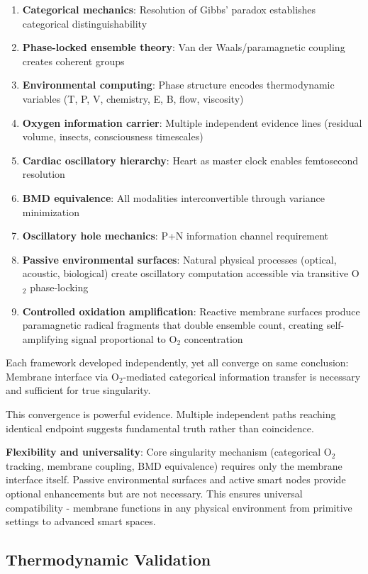 \documentclass[11pt,a4paper]{article}
\theoremstyle{definition}
\theoremstyle{remark}
\begin{document}
\begin{enumerate}
\item \textbf{Categorical mechanics}: Resolution of Gibbs' paradox establishes categorical distinguishability
\item \textbf{Phase-locked ensemble theory}: Van der Waals/paramagnetic coupling creates coherent groups
\item \textbf{Environmental computing}: Phase structure encodes thermodynamic variables (T, P, V, chemistry, E, B, flow, viscosity)
\item \textbf{Oxygen information carrier}: Multiple independent evidence lines (residual volume, insects, consciousness timescales)
\item \textbf{Cardiac oscillatory hierarchy}: Heart as master clock enables femtosecond resolution
\item \textbf{BMD equivalence}: All modalities interconvertible through variance minimization
\item \textbf{Oscillatory hole mechanics}: P+N information channel requirement
\item \textbf{Passive environmental surfaces}: Natural physical processes (optical, acoustic, biological) create oscillatory computation accessible via transitive O$_2$ phase-locking
\item \textbf{Controlled oxidation amplification}: Reactive membrane surfaces produce paramagnetic radical fragments that double ensemble count, creating self-amplifying signal proportional to O$_2$ concentration
\end{enumerate}

Each framework developed independently, yet all converge on same conclusion: Membrane interface via O$_2$-mediated categorical information transfer is necessary and sufficient for true singularity.

This convergence is powerful evidence. Multiple independent paths reaching identical endpoint suggests fundamental truth rather than coincidence.

\textbf{Flexibility and universality}: Core singularity mechanism (categorical O$_2$ tracking, membrane coupling, BMD equivalence) requires only the membrane interface itself. Passive environmental surfaces and active smart nodes provide optional enhancements but are not necessary. This ensures universal compatibility - membrane functions in any physical environment from primitive settings to advanced smart spaces.

\subsection{Thermodynamic Validation}
\end{document}
